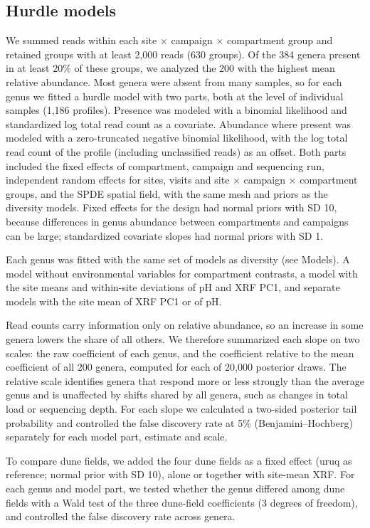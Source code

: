 \documentclass[11pt]{article}
\begin{document}
\subsection{Hurdle models}\label{hurdle}
We summed reads within each site $\times$ campaign $\times$ compartment group and retained groups with at least 2,000 reads (630 groups). Of the 384 genera present in at least 20\% of these groups, we analyzed the 200 with the highest mean relative abundance. Most genera were absent from many samples, so for each genus we fitted a hurdle model with two parts, both at the level of individual samples (1,186 profiles). Presence was modeled with a binomial likelihood and standardized log total read count as a covariate. Abundance where present was modeled with a zero-truncated negative binomial likelihood, with the log total read count of the profile (including unclassified reads) as an offset. Both parts included the fixed effects of compartment, campaign and sequencing run, independent random effects for sites, visits and site $\times$ campaign $\times$ compartment groups, and the SPDE spatial field, with the same mesh and priors as the diversity models. Fixed effects for the design had normal priors with SD 10, because differences in genus abundance between compartments and campaigns can be large; standardized covariate slopes had normal priors with SD 1.

Each genus was fitted with the same set of models as diversity (see Models). A model without environmental variables for compartment contrasts, a model with the site means and within-site deviations of pH and XRF PC1, and separate models with the site mean of XRF PC1 or of pH. 

Read counts carry information only on relative abundance, so an increase in some genera lowers the share of all others. We therefore summarized each slope on two scales: the raw coefficient of each genus, and the coefficient relative to the mean coefficient of all 200 genera, computed for each of 20,000 posterior draws. The relative scale identifies genera that respond more or less strongly than the average genus and is unaffected by shifts shared by all genera, such as changes in total load or sequencing depth. For each slope we calculated a two-sided posterior tail probability and controlled the false discovery rate at 5\% (Benjamini--Hochberg) separately for each model part, estimate and scale. 

To compare dune fields, we added the four dune fields as a fixed effect (uruq as reference; normal prior with SD 10), alone or together with site-mean XRF. For each genus and model part, we tested whether the genus differed among dune fields with a Wald test of the three dune-field coefficients (3 degrees of freedom), and controlled the false discovery rate across genera.
\end{document}
